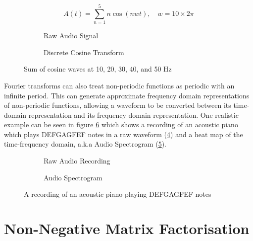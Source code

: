 \begin{equation} 
\label{eq1:sum-five-freq}
A(t)=\sum_{n=1}^{5}n\cos(nwt),\quad w=10\times2\pi
\end{equation}

\begin{figure}[ht]
\centering
\begin{subfigure}{0.45\textwidth}
    
    \caption{Raw Audio Signal}
    \label{fig:idct}
\end{subfigure}
\hfill
\begin{subfigure}{0.45\textwidth}
    
    \caption{Discrete Cosine Transform}
    \label{fig:dct}
\end{subfigure}
\caption{Sum of cosine waves at 10, 20, 30, 40, and 50 Hz}
\label{fig:dct-idct}
\end{figure}

Fourier transforms can also treat non-periodic functions as periodic with an infinite period. This can generate approximate frequency domain representations of non-periodic functions, allowing a waveform to be converted between its time-domain representation and its frequency domain representation. One realistic example can be seen in figure \ref{fig:piano-wav-spec} which shows a recording of an acoustic piano which plays DEFGAGFEF notes in a raw waveform (\ref{fig:piano-wav}) and a heat map of the time-frequency domain, a.k.a Audio Spectrogram (\ref{fig:piano-spec}).

\begin{figure}[ht]
\centering
\begin{subfigure}{0.49\textwidth}
    
    \caption{Raw Audio Recording}
    \label{fig:piano-wav}
\end{subfigure}
\hfill
\begin{subfigure}{0.49\textwidth}
    
    \caption{Audio Spectrogram}
    \label{fig:piano-spec}
\end{subfigure}
\caption{A recording of an acoustic piano playing DEFGAGFEF notes}
\label{fig:piano-wav-spec}
\end{figure}

\section{Non-Negative Matrix Factorisation}
\label{sec:nmf}

